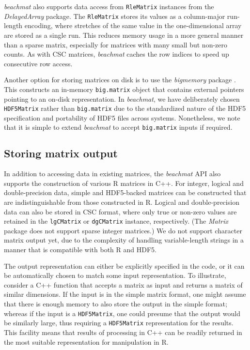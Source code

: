 \documentclass[10pt,letterpaper]{article}
\newcommand{\beachmat}{\textit{beachmat}}
\newcommand{\code}[1]{\texttt{#1}}
\begin{document}
\beachmat{} also supports data access from \code{RleMatrix} instances from the \textit{DelayedArray} package.
The \code{RleMatrix} stores its values as a column-major run-length encoding, where stretches of the same value in the one-dimensional array are stored as a single run.
This reduces memory usage in a more general manner than a sparse matrix, especially for matrices with many small but non-zero counts.
As with CSC matrices, \beachmat{} caches the row indices to speed up consecutive row access.

Another option for storing matrices on disk is to use the \textit{bigmemory} package \cite{kane2013scalable}.
This constructs an in-memory \code{big.matrix} object that contains external pointers pointing to an on-disk representation.
In \beachmat{}, we have deliberately chosen \code{HDF5Matrix} rather than \code{big.matrix} due to the standardized nature of the HDF5 specification and portability of HDF5 files across systems.
Nonetheless, we note that it is simple to extend \beachmat{} to accept \code{big.matrix} inputs if required.

\subsection*{Storing matrix output}
In addition to accessing data in existing matrices, the \beachmat{} API also supports the construction of various R matrices in C++.
For integer, logical and double-precision data, simple and HDF5-backed matrices can be constructed that are indistinguishable from those constructed in R.
Logical and double-precision data can also be stored in CSC format, where only true or non-zero values are retained in the \code{lgCMatrix} or \code{dgCMatrix} instance, respectively.
(The \textit{Matrix} package does not support sparse integer matrices.)
We do not support character matrix output yet, due to the complexity of handling variable-length strings in a manner that is compatible with both R and HDF5.

The output representation can either be explicitly specified in the code, or it can be automatically chosen to match some input representation.
To illustrate, consider a C++ function that accepts a matrix as input and returns a matrix of similar dimensions.
If the input is in the simple matrix format, one might assume that there is enough memory to also store the output in the simple format;
whereas if the input is a \code{HDF5Matrix}, one could presume that the output would be similarly large, thus requiring a \code{HDF5Matrix} representation for the results.
This facility means that results of processing in C++ can be readily returned in the most suitable representation for manipulation in R.
 
\end{document}
